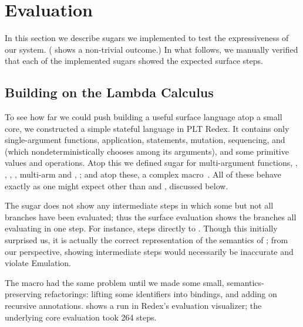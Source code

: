 \section{Evaluation}
\label{sec:reval-examples}

In this section we describe sugars we implemented to test the
expressiveness of our system. 
( shows a non-trivial outcome.)
In what follows, we manually
verified that each of the implemented sugars showed the expected
surface steps.

\subsection{Building on the Lambda Calculus}

To see how far we could push building a useful surface language atop a
small core, we constructed a
simple stateful language in PLT Redex.  It contains only
single-argument functions, application,  statements,
mutation, sequencing, and  (which nondeterministically
chooses among its arguments), and some primitive values and operations.
Atop this we defined sugar for
multi-argument functions, , , ,
, multi-arm  and , ;
and atop these, a complex  macro~\cite{sk:automata-macros}.
All of
these behave exactly as one might expect other than  and
, discussed below.

The  sugar does not show any intermediate steps in which
some but not all branches have been evaluated; thus the surface
evaluation shows the branches all evaluating in one step. For instance,
 steps directly to
. Though this initially
surprised us, it is actually the correct representation of the
semantics of ; from our perspective,
showing intermediate steps would necessarily be
inaccurate and violate Emulation.

The  macro had the same problem until we made some
small, semantics-preserving refactorings: lifting some identifiers
into  bindings, and adding \Code{!} on recursive
annotations.  shows a run in Redex's evaluation
visualizer; the underlying core evaluation took 264 steps.

